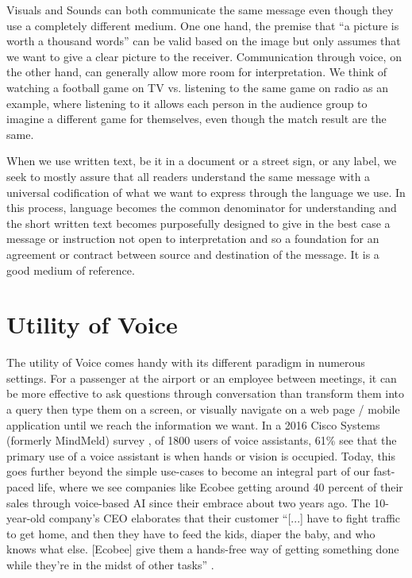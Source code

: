 Visuals and Sounds can both communicate the same message even though they use a  completely different medium. One one hand, the premise that ``a picture is worth a thousand words'' can be valid based on the image but only assumes that we want to give a clear picture to the receiver. Communication through voice, on the other hand, can generally allow more room for interpretation. We think of watching a football game on TV vs. listening to the same game on radio as an example, where listening to it allows each person in the audience group to imagine a different game for themselves, even though the match result are the same.



When we use written text, be it in a document or a street sign, or any label, we seek to mostly assure that all %
readers understand the same message with a universal codification of what we want to express through the language we use. In this process, language becomes the common denominator for understanding and the short written text becomes purposefully designed to give in the best case a message or instruction not open to interpretation and so a foundation for an agreement or contract between %
source and 
destination of the message. It is a good medium of reference. 

\section{Utility of Voice}
The utility of Voice comes handy with its different paradigm in numerous settings. 
For a passenger at the airport or an employee between meetings, 
it can be more effective to ask questions through conversation than transform them into a query then type them on a screen,
or visually navigate on a web page / mobile application until we reach the information we want. In a 2016 Cisco Systems (formerly MindMeld) survey \cite{mindmeldReport}, of 1800 users of voice assistants, 61\% see that the primary use of a voice assistant is when hands or vision is occupied.
Today, this goes further beyond the simple use-cases to become an integral part of our fast-paced life, where we see companies like Ecobee getting around 40 percent of their sales through voice-based AI \cite{mit:Alexa} since their embrace about two years ago. The 10-year-old company's CEO elaborates that their customer “[...] have to fight traffic to get home, and then they have to feed the kids, diaper the baby, and who knows what else. [Ecobee] give them a hands-free way of getting something done while they're in the midst of other tasks” \cite{mit:Alexa} .


